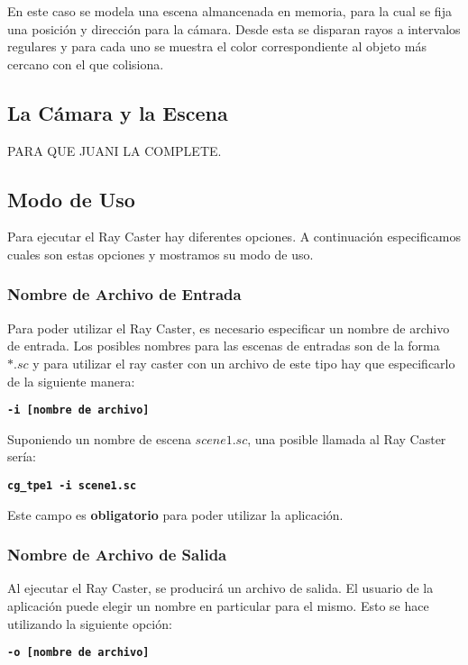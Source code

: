 \documentclass[a4paper,10pt]{article}
\begin{document}
En este caso se modela una escena almancenada en memoria, para la cual se fija una posici\'on y direcci\'on para la c\'amara.  Desde esta se disparan rayos a intervalos regulares y para cada uno se muestra el color correspondiente al objeto m\'as cercano con el que colisiona.


\subsection{La C\'amara y la Escena}

PARA QUE JUANI LA COMPLETE.

\subsection{Modo de Uso}
Para ejecutar el Ray Caster hay diferentes opciones.  A continuaci\'on especificamos cuales son estas opciones y mostramos su modo de uso.

\subsubsection{Nombre de Archivo de Entrada}
Para poder utilizar el Ray Caster, es necesario especificar un nombre de archivo de entrada.  Los posibles nombres para las escenas de entradas son de la forma $*.sc$ y para utilizar el ray caster con un archivo de este tipo hay que especificarlo de la siguiente manera:

\begin{center}
 \textbf{\texttt{-i [nombre de archivo]}}
\end{center}

Suponiendo un nombre de escena $scene1.sc$, una posible llamada al Ray Caster ser\'ia:

\begin{center}
 \textbf{\texttt{cg\_tpe1 -i scene1.sc}}
\end{center}

Este campo es \textbf{obligatorio} para poder utilizar la aplicaci\'on.
\subsubsection{Nombre de Archivo de Salida}

Al ejecutar el Ray Caster, se producirá un archivo de salida.  El usuario de la aplicación puede elegir un nombre en particular para el mismo.  Esto se hace utilizando la siguiente opci\'on:

\begin{center}
  \textbf{\texttt{-o [nombre de archivo]}}
\end{center}
\end{document}
